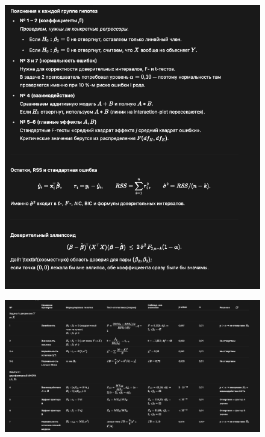 \documentclass[12pt]{article}
\begin{document}
\begin{figure}[H]
    \centering
    \includegraphics[width=1\linewidth]{image copy 6.png}
\end{figure}
\newpage
\begin{figure}[H]
    \centering
    \includegraphics[width=1\linewidth]{image copy 7.png}
\end{figure}
\end{document}
